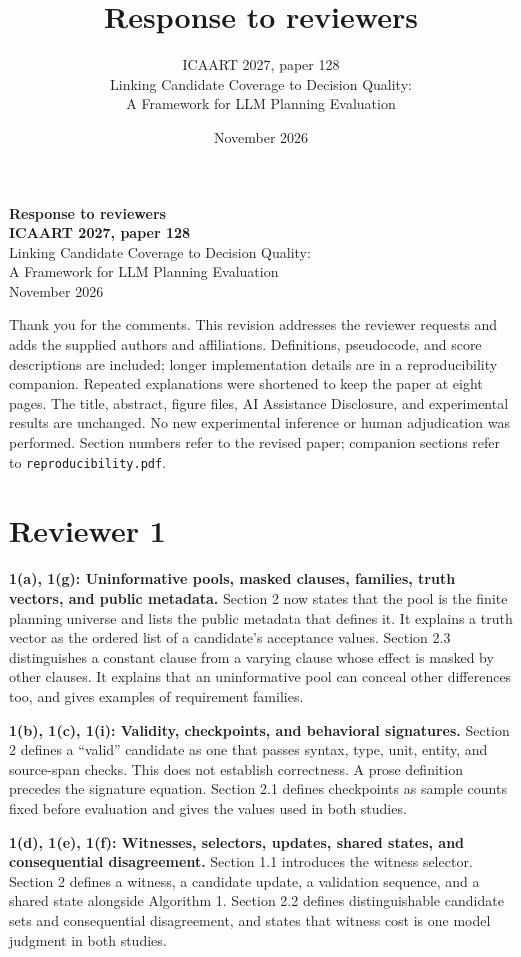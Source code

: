 \documentclass[11pt,a4paper]{scrartcl}
\title{Response to reviewers}
\subtitle{ICAART 2027, paper 128\\Linking Candidate Coverage to Decision Quality:\\A Framework for LLM Planning Evaluation}
\author{}
\date{November 2026}
\begin{document}
\begin{center}
{\Large\sffamily\bfseries Response to reviewers}\\[0.5em]
{\bfseries ICAART 2027, paper 128}\\
Linking Candidate Coverage to Decision Quality:\\
A Framework for LLM Planning Evaluation\\[0.4em]
November 2026
\end{center}

Thank you for the comments. This revision addresses the reviewer requests and adds the supplied authors and affiliations. Definitions, pseudocode, and score descriptions are included; longer implementation details are in a reproducibility companion. Repeated explanations were shortened to keep the paper at eight pages. The title, abstract, figure files, AI Assistance Disclosure, and experimental results are unchanged. No new experimental inference or human adjudication was performed. Section numbers refer to the revised paper; companion sections refer to \texttt{reproducibility.pdf}.

\section*{Reviewer 1}

\textbf{1(a), 1(g): Uninformative pools, masked clauses, families, truth vectors, and public metadata.}
Section 2 now states that the pool is the finite planning universe and lists the public metadata that defines it. It explains a truth vector as the ordered list of a candidate's acceptance values. Section 2.3 distinguishes a constant clause from a varying clause whose effect is masked by other clauses. It explains that an uninformative pool can conceal other differences too, and gives examples of requirement families.

\textbf{1(b), 1(c), 1(i): Validity, checkpoints, and behavioral signatures.}
Section 2 defines a ``valid'' candidate as one that passes syntax, type, unit, entity, and source-span checks. This does not establish correctness. A prose definition precedes the signature equation. Section 2.1 defines checkpoints as sample counts fixed before evaluation and gives the values used in both studies.

\textbf{1(d), 1(e), 1(f): Witnesses, selectors, updates, shared states, and consequential disagreement.}
Section 1.1 introduces the witness selector. Section 2 defines a witness, a candidate update, a validation sequence, and a shared state alongside Algorithm 1. Section 2.2 defines distinguishable candidate sets and consequential disagreement, and states that witness cost is one model judgment in both studies.
\end{document}
